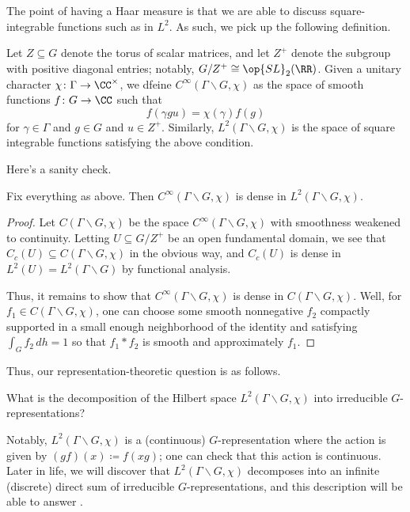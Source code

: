 \documentclass{article}
\begin{document}
The point of having a Haar measure is that we are able to discuss square-integrable functions such as in $L^2$. As such, we pick up the following definition.
\begin{definition}
	Let $Z\subseteq G$ denote the torus of scalar matrices, and let $Z^+$ denote the subgroup with positive diagonal entries; notably, $G/Z^+\cong\op{SL}_2(\RR)$. Given a unitary character $\chi\colon\Gamma\to\CC^\times$, we dfeine $C^\infty(\Gamma\backslash G,\chi)$ as the space of smooth functions $f\colon G\to\CC$ such that
	\[f(\gamma gu)=\chi(\gamma)f(g)\]
	for $\gamma\in\Gamma$ and $g\in G$ and $u\in Z^+$. Similarly, $L^2(\Gamma\backslash G,\chi)$ is the space of square integrable functions satisfying the above condition.
\end{definition}
Here's a sanity check.
\begin{lemma}
	Fix everything as above. Then $C^\infty(\Gamma\backslash G,\chi)$ is dense in $L^2(\Gamma\backslash G,\chi)$.
\end{lemma}
\begin{proof}
	Let $C(\Gamma\backslash G,\chi)$ be the space $C^\infty(\Gamma\backslash G,\chi)$ with smoothness weakened to continuity. Letting $U\subseteq G/Z^+$ be an open fundamental domain, we see that $C_c(U)\subseteq C(\Gamma\backslash G,\chi)$ in the obvious way, and $C_c(U)$ is dense in $L^2(U)=L^2(\Gamma\backslash G)$ by functional analysis.

	Thus, it remains to show that $C^\infty(\Gamma\backslash G,\chi)$ is dense in $C(\Gamma\backslash G,\chi)$. Well, for $f_1\in C(\Gamma\backslash G,\chi)$, one can choose some smooth nonnegative $f_2$ compactly supported in a small enough neighborhood of the identity and satisfying $\int_Gf_2\,dh=1$ so that $f_1*f_2$ is smooth and approximately $f_1$.
\end{proof}
Thus, our representation-theoretic question is as follows.
\begin{ques} \label{ques:spectal-rep-theory}
	What is the decomposition of the Hilbert space $L^2(\Gamma\backslash G,\chi)$ into irreducible $G$-rep\-resen\-tations?
\end{ques}
Notably, $L^2(\Gamma\backslash G,\chi)$ is a (continuous) $G$-representation where the action is given by $(gf)(x)\coloneqq f(xg)$; one can check that this action is continuous. Later in life, we will discover that $L^2(\Gamma\backslash G,\chi)$ decomposes into an infinite (discrete) direct sum of irreducible $G$-representations, and this description will be able to answer .
\end{document}
